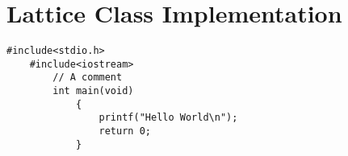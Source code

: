 \chapter{Lattice Class Implementation}\label{ch:lattice}

\begin{lstlisting}[caption={An example},label=lst:useless]
    #include<stdio.h>
    #include<iostream>
        // A comment
        int main(void)
            {
                printf("Hello World\n");
                return 0;
            }
\end{lstlisting}

